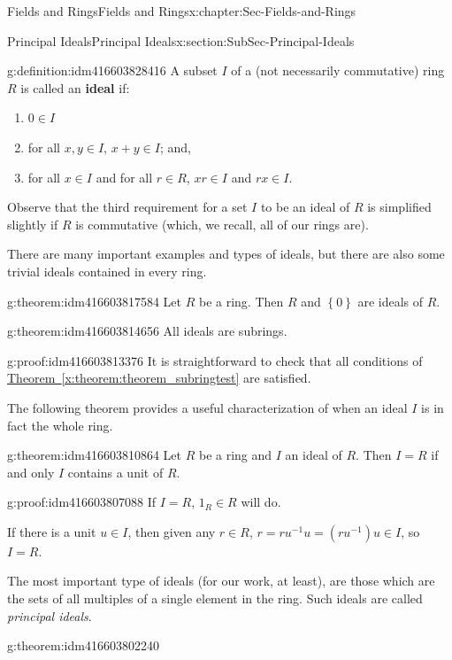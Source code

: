 \documentclass[oneside,10pt,]{book}
\newcommand{\terminology}[1]{\textbf{#1}}
\numberwithin{equation}{section}
\newcommand{\set}[1]{\left\{ {#1} \right\}}
\begin{document}
\begin{chapterptx}{Fields and Rings}{}{Fields and Rings}{}{}{x:chapter:Sec-Fields-and-Rings}
\begin{sectionptx}{Principal Ideals}{}{Principal Ideals}{}{}{x:section:SubSec-Principal-Ideals}
\begin{definition}{}{g:definition:idm416603828416}%
A subset \(I\) of a (not necessarily commutative) ring \(R\) is called an \terminology{ideal} if:%
\begin{enumerate}
\item{}\(0\in I\)%
\item{}for all \(x,y\in I\), \(x+y\in I\); and,%
\item{}for all \(x\in I\) and for all \(r\in R\), \(xr\in I\) and \(rx\in I\).%
\end{enumerate}
%
\end{definition}
Observe that the third requirement for a set \(I\) to be an ideal of \(R\) is simplified slightly if \(R\) is commutative (which, we recall, all of our rings are).%
\par
There are many important examples and types of ideals, but there are also some trivial ideals contained in every ring.%
\begin{theorem}{}{}{g:theorem:idm416603817584}%
Let \(R\) be a ring. Then \(R\) and \(\set{0}\) are ideals of \(R\).%
\end{theorem}
\begin{theorem}{}{}{g:theorem:idm416603814656}%
All ideals are subrings.%
\end{theorem}
\begin{proofptx}{}{g:proof:idm416603813376}
It is straightforward to check that all conditions of \hyperref[x:theorem:theorem_subringtest]{Theorem~\ref{x:theorem:theorem_subringtest}} are satisfied.%
\end{proofptx}
The following theorem provides a useful characterization of when an ideal \(I\) is in fact the whole ring.%
\begin{theorem}{}{}{g:theorem:idm416603810864}%
Let \(R\) be a ring and \(I\) an ideal of \(R\). Then \(I = R\) if and only \(I\) contains a unit of \(R\).%
\end{theorem}
\begin{proofptx}{}{g:proof:idm416603807088}
If \(I = R\), \(1_R\in R\) will do.%
\par
If there is a unit \(u\in I\), then given any \(r\in R\), \(r = r u^{-1} u = (ru^{-1}) u \in I\), so \(I = R\).%
\end{proofptx}
The most important type of ideals (for our work, at least), are those which are the sets of all multiples of a single element in the ring. Such ideals are called \emph{principal ideals}.%
\begin{theorem}{}{}{g:theorem:idm416603802240}%

\end{theorem}
\end{sectionptx}
\end{chapterptx}
\end{document}
